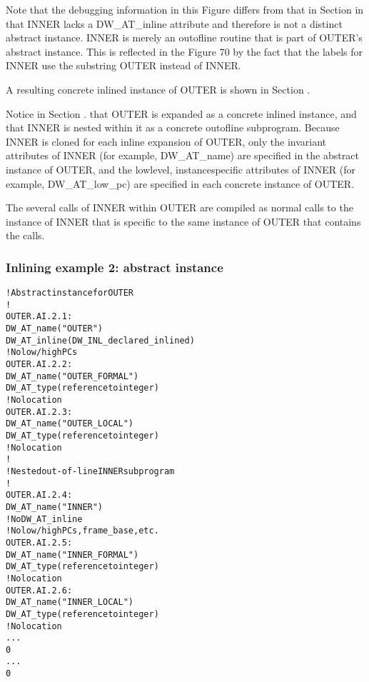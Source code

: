 Note that the debugging information in this Figure differs from
that in 
Section 
in that INNER lacks a DW\_AT\_inline attribute
and therefore is not a distinct abstract instance. INNER
is merely an out\dash of\dash line routine that is part of OUTER’s
abstract instance. This is reflected in the Figure 70 by
the fact that the labels for INNER use the substring OUTER
instead of INNER.

A resulting concrete inlined instance of OUTER is shown in
Section .

Notice in 
Section .
that OUTER is expanded as a concrete
inlined instance, and that INNER is nested within it as a
concrete out\dash of\dash line subprogram. Because INNER is cloned
for each inline expansion of OUTER, only the invariant
attributes of INNER 
(for example, DW\_AT\_name) are specified
in the abstract instance of OUTER, and the low\dash level,
instance\dash specific attributes of INNER (for example,
DW\_AT\_low\_pc) are specified in each concrete instance of OUTER.

The several calls of INNER within OUTER are compiled as normal
calls to the instance of INNER that is specific to the same
instance of OUTER that contains the calls.


\subsubsection{Inlining example 2: abstract instance}
\label{app:inliningexample2abstractinstance}
\begin{alltt}
    ! Abstract instance for OUTER
    !
OUTER.AI.2.1:
        DW\_AT\_name("OUTER")
        DW\_AT\_inline(DW\_INL\_declared\_inlined)
        ! No low/high PCs
OUTER.AI.2.2:
            DW\_AT\_name("OUTER\_FORMAL")
            DW\_AT\_type(reference to integer)
            ! No location
OUTER.AI.2.3:
            DW\_AT\_name("OUTER\_LOCAL")
            DW\_AT\_type(reference to integer)
            ! No location
        !
        ! Nested out-of-line INNER subprogram
        !
OUTER.AI.2.4:
            DW\_AT\_name("INNER")
            ! No DW\_AT\_inline
            ! No low/high PCs, frame\_base, etc.
OUTER.AI.2.5:
                DW\_AT\_name("INNER\_FORMAL")
                DW\_AT\_type(reference to integer)
                ! No location
OUTER.AI.2.6:
                DW\_AT\_name("INNER\_LOCAL")
                DW\_AT\_type(reference to integer)
                ! No location
            ...
            0
        ...
        0
\end{alltt}

